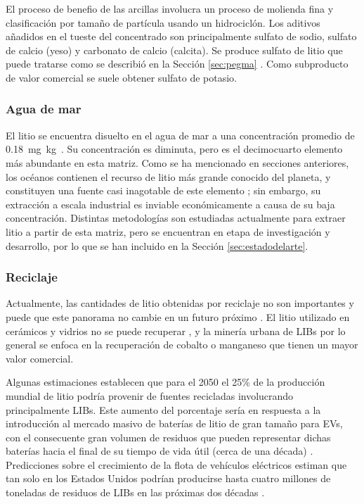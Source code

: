El proceso de benefio de las arcillas involucra un proceso de molienda fina y clasificación por tamaño de partícula usando un hidrociclón. Los aditivos añadidos en el tueste del concentrado son principalmente sulfato de sodio, sulfato de calcio (yeso) y carbonato de calcio (calcita). Se produce sulfato de litio que puede tratarse como se describió en la Sección \ref{sec:pegma} \citep{Bacanora2018}. Como subproducto de valor comercial se suele obtener sulfato de potasio.

\subsubsection{Agua de mar}
El litio se encuentra disuelto en el agua de mar a una concentración promedio de 0.18~mg~kg\mnn\ \citep{Evans2013}. Su concentración es diminuta, pero es el decimocuarto elemento más abundante en esta matriz. Como se ha mencionado en secciones anteriores, los océanos contienen el recurso de litio más grande conocido del planeta, y constituyen una fuente casi inagotable de este elemento \citep{Yang2018}; sin embargo, su extracción a escala industrial es inviable económicamente a causa de su baja concentración. Distintas metodologías son estudiadas actualmente para extraer litio a partir de esta matriz, pero se encuentran en etapa de investigación y desarrollo, por lo que se han incluido en la Sección \ref{sec:estadodelarte}.

\subsubsection{Reciclaje}

Actualmente, las cantidades de litio obtenidas por reciclaje no son importantes y puede que este panorama no cambie en un futuro próximo \citep{Olivetti2017}. El litio utilizado en cerámicos y vidrios no se puede recuperar \citep{CHRISTMANN2015}, y la minería urbana de \acp{LIB} por lo general se enfoca en la recuperación de cobalto o manganeso que tienen un mayor valor comercial. 

Algunas estimaciones establecen que para el 2050 el 25\% de la producción mundial de litio podría provenir de fuentes recicladas involucrando principalmente \ac{LIB}s. Este aumento del porcentaje sería en respuesta a la introducción al mercado masivo de baterías de litio de gran tamaño para \ac{EV}s, con el consecuente gran volumen de residuos que pueden representar dichas baterías hacia el final de su tiempo de vida útil (cerca de una década) \citep{STERBA2019416, Evans2013}. Predicciones sobre el crecimiento de la flota de vehículos eléctricos estiman que tan solo en los Estados Unidos podrían producirse hasta cuatro millones de toneladas de residuos de \ac{LIB}s en las próximas dos décadas \citep{RICHA2014}. 

